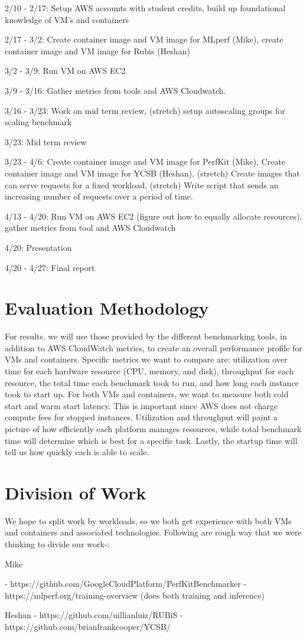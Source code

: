 \documentclass[11pt]{article}
\begin{document}
2/10 - 2/17: Setup AWS accounts with student credits, build up foundational knowledge of VM's and containers

2/17 - 3/2: Create container image and VM image for MLperf (Mike), create container image and VM image for Rubis (Heshan)

3/2 - 3/9: Run VM on AWS EC2

3/9 - 3/16: Gather metrics from tools and AWS Cloudwatch.

3/16 - 3/23:  Work on mid term review, (stretch) setup autoscaling groups for scaling benchmark

3/23: Mid term review

3/23 - 4/6: Create container image and VM image for PerfKit (Mike), Create container image and VM image for YCSB (Heshan), (stretch) Create images that can serve requests for a fixed workload, (stretch) Write script that sends an increasing number of requests over a period of time.

4/13 - 4/20: Run VM on AWS EC2 (figure out how to equally allocate resources), gather metrics from tool and AWS Cloudwatch

4/20: Presentation

4/20 - 4/27: Final report


\section{Evaluation Methodology}

For results, we will use those provided by the different benchmarking tools, in addition to AWS CloudWatch metrics, to create an overall performance profile for VMs and containers. Specific metrics we want to compare are: utilization over time for each hardware resource (CPU, memory, and disk), throughput for each resource, the total time each benchmark took to run, and how long each instance took to start up. For both VMs and containers, we want to measure both cold start and warm start latency. This is important since AWS does not charge compute fees for stopped instances. Utilization and throughput will paint a picture of how efficiently each platform manages resources, while total benchmark time will determine which is best for a specific task. Lastly, the startup time will tell us how quickly each is able to scale.

\section{Division of Work}

We hope to split work by workloads, so we both get experience with both VMs and containers and associated technologies. Following are rough way that we were thinking to divide our work-: 


Mike 

  - https://github.com/GoogleCloudPlatform/PerfKitBenchmarker
  - https://mlperf.org/training-overview (does both training and inference)

Heshan
  - https://github.com/uillianluiz/RUBiS
  - https://github.com/brianfrankcooper/YCSB/
\end{document}
